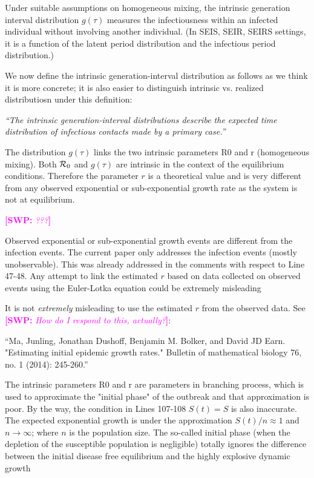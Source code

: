 \documentclass[12pt]{article}
\newcommand{\Rx}[1]{\ensuremath{{\cal R}_{#1}}}
\newcommand{\Ro}{\Rx{0}}
\newcommand{\revtext}{\textsf}
\newcommand{\newtext}[1]{\textsl{``#1''}}
\newcommand{\comment}[3]{\textcolor{#1}{\textbf{[#2: }\textsl{#3}\textbf{]}}}
\newcommand{\swp}[1]{\comment{magenta}{SWP}{#1}}
\begin{document}
\revtext{Under suitable assumptions on homogeneous mixing, the intrinsic
generation interval distribution $g(\tau)$ measures the infectiousness within
an infected individual without involving another individual. (In SEIS,
SEIR, SEIRS settings, it is a function of the latent period distribution
and the infectious period distribution.)}

We now define the intrinsic generation-interval distribution as follows as we think it is more concrete; it is also easier to distinguish intrinsic vs. realized distributiosn under this definition:

\newtext{The \emph{intrinsic} generation-interval distributions describe the expected time distribution of infectious contacts made by a primary case.}

\revtext{The distribution $g(\tau)$ links the two intrinsic parameters R0 and r
(homogeneous mixing). Both $\Ro$ and $g(\tau)$ are intrinsic in the context of the equilibrium conditions. Therefore the parameter $r$ is a theoretical value and is very different from any observed exponential
or sub-exponential growth rate as the system is not at equilibrium.}

\swp{???}

\revtext{Observed exponential or sub-exponential growth events are different from the infection events. The current paper only addresses the infection events (mostly unobservable). This was
already addressed in the comments with respect to Line 47-48.
Any attempt to link the estimated $r$ based on data collected
on observed events using the Euler-Lotka equation could be extremely misleading}

It is not \emph{extremely} misleading to use the estimated $r$ from the observed data. 
See \swp{How do I respond to this, actually?}: 

``Ma, Junling, Jonathan Dushoff, Benjamin M. Bolker, and David JD Earn. "Estimating initial epidemic growth rates." Bulletin of mathematical biology 76, no. 1 (2014): 245-260.''

\revtext{
The intrinsic parameters R0 and r are parameters in branching
process, which is used to approximate the "initial phase" of the
outbreak and that approximation is poor. By the way, the condition in Lines 107-108 $S(t) = S$ is also inaccurate. The expected exponential growth is under the approximation $S(t)/n \approx 1$ and
$n \to \infty$; where $n$ is the population size. The so-called initial
phase (when the depletion of the susceptible population is negligible) totally ignores the difference between the initial disease free equilibrium and the highly explosive dynamic growth
}
\end{document}
